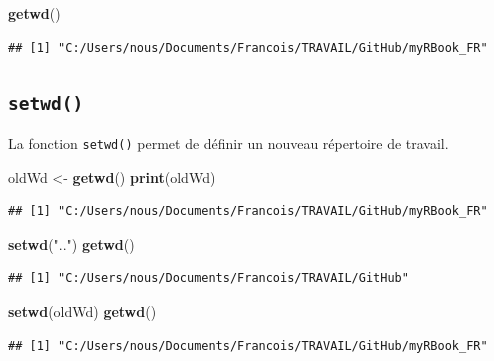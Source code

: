 \documentclass[]{book}
\newenvironment{Shaded}{\begin{snugshade}}{\end{snugshade}}
\newcommand{\KeywordTok}[1]{\textcolor[rgb]{0.13,0.29,0.53}{\textbf{#1}}}
\newcommand{\NormalTok}[1]{#1}
\newcommand{\StringTok}[1]{\textcolor[rgb]{0.31,0.60,0.02}{#1}}
\begin{document}
\begin{Shaded}
\begin{Highlighting}[]
\KeywordTok{getwd}\NormalTok{()}
\end{Highlighting}
\end{Shaded}

\begin{verbatim}
## [1] "C:/Users/nous/Documents/Francois/TRAVAIL/GitHub/myRBook_FR"
\end{verbatim}

\hypertarget{l015setwd}{%
\subsection{\texorpdfstring{\texttt{setwd()}}{setwd()}}\label{l015setwd}}

La fonction \texttt{setwd()} permet de définir un nouveau répertoire de travail.

\begin{Shaded}
\begin{Highlighting}[]
\NormalTok{oldWd <-}\StringTok{ }\KeywordTok{getwd}\NormalTok{()}
\KeywordTok{print}\NormalTok{(oldWd)}
\end{Highlighting}
\end{Shaded}

\begin{verbatim}
## [1] "C:/Users/nous/Documents/Francois/TRAVAIL/GitHub/myRBook_FR"
\end{verbatim}

\begin{Shaded}
\begin{Highlighting}[]
\KeywordTok{setwd}\NormalTok{(}\StringTok{".."}\NormalTok{)}
\KeywordTok{getwd}\NormalTok{()}
\end{Highlighting}
\end{Shaded}

\begin{verbatim}
## [1] "C:/Users/nous/Documents/Francois/TRAVAIL/GitHub"
\end{verbatim}

\begin{Shaded}
\begin{Highlighting}[]
\KeywordTok{setwd}\NormalTok{(oldWd)}
\KeywordTok{getwd}\NormalTok{()}
\end{Highlighting}
\end{Shaded}

\begin{verbatim}
## [1] "C:/Users/nous/Documents/Francois/TRAVAIL/GitHub/myRBook_FR"
\end{verbatim}
\end{document}
